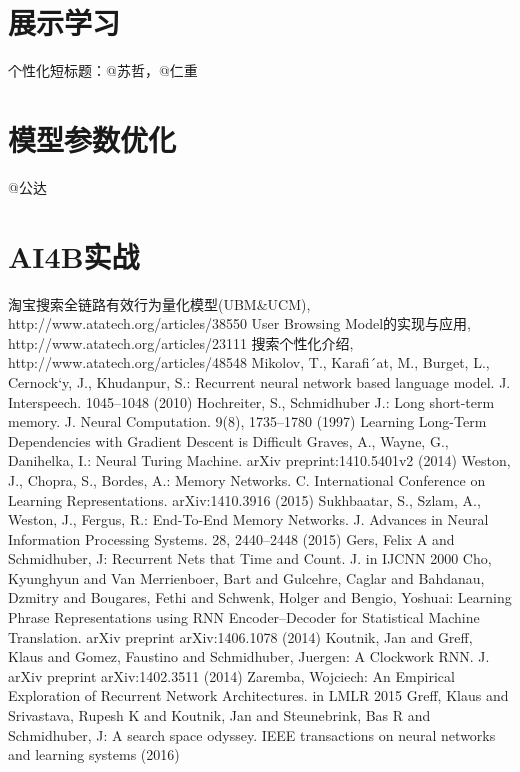 \subsection{}

\section{展示学习}
	个性化短标题：@苏哲，@仁重 

\section{模型参数优化} 
	@公达

\section{AI4B实战} 

\begin{thebibliography}{99}
 淘宝搜索全链路有效行为量化模型(UBM\&UCM), http://www.atatech.org/articles/38550
 User Browsing Model的实现与应用, http://www.atatech.org/articles/23111
 搜索个性化介绍, http://www.atatech.org/articles/48548
 Mikolov, T., Karafi´at, M., Burget, L., Cernock`y, J., Khudanpur, S.: Recurrent neural network based language model. J. Interspeech. 1045–1048 (2010)
  Hochreiter, S., Schmidhuber J.: Long short-term memory. J. Neural Computation. 9(8), 1735–1780 (1997)
 Learning Long-Term Dependencies with Gradient Descent is Difficult
 Graves, A., Wayne, G., Danihelka, I.: Neural Turing Machine. arXiv preprint:1410.5401v2 (2014)
 Weston, J., Chopra, S., Bordes, A.: Memory Networks. C. International Conference on Learning Representations. arXiv:1410.3916 (2015)
 Sukhbaatar, S., Szlam, A., Weston, J., Fergus, R.: End-To-End Memory Networks. J. Advances in Neural Information Processing Systems. 28, 2440–2448 (2015)
 Gers, Felix A and Schmidhuber, J: Recurrent Nets that Time and Count. J. in IJCNN 2000
 Cho, Kyunghyun and Van Merrienboer, Bart and Gulcehre, Caglar and Bahdanau, Dzmitry and Bougares, Fethi and Schwenk, Holger and Bengio, Yoshuai: Learning Phrase Representations using RNN Encoder–Decoder for Statistical Machine Translation. arXiv preprint arXiv:1406.1078 (2014)
 Koutnik, Jan and Greff, Klaus and Gomez, Faustino and Schmidhuber, Juergen: A Clockwork RNN. J. arXiv preprint arXiv:1402.3511 (2014)
 Zaremba, Wojciech: An Empirical Exploration of Recurrent Network Architectures. in LMLR 2015
 Greff, Klaus and Srivastava, Rupesh K and Koutnik, Jan and Steunebrink, Bas R and Schmidhuber, J: A search space odyssey. IEEE transactions on neural networks and learning systems (2016)
\end{thebibliography}

 
